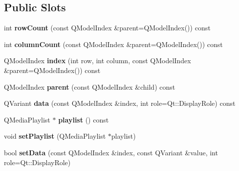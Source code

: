 \subsection*{Public Slots}
\begin{DoxyCompactItemize}
\item 
\hypertarget{class_playlist_model_a2deef5b14f8f66431a55fdb0484025b6}{int {\bfseries row\-Count} (const Q\-Model\-Index \&parent=Q\-Model\-Index()) const }\label{class_playlist_model_a2deef5b14f8f66431a55fdb0484025b6}

\item 
\hypertarget{class_playlist_model_a50cd819e7dec4c4881eebaed8130944d}{int {\bfseries column\-Count} (const Q\-Model\-Index \&parent=Q\-Model\-Index()) const }\label{class_playlist_model_a50cd819e7dec4c4881eebaed8130944d}

\item 
\hypertarget{class_playlist_model_a03d1879138b2a0c6c68d7f6d98cfa92a}{Q\-Model\-Index {\bfseries index} (int row, int column, const Q\-Model\-Index \&parent=Q\-Model\-Index()) const }\label{class_playlist_model_a03d1879138b2a0c6c68d7f6d98cfa92a}

\item 
\hypertarget{class_playlist_model_a8ff71ee8d706da034fbe8b9b613a940c}{Q\-Model\-Index {\bfseries parent} (const Q\-Model\-Index \&child) const }\label{class_playlist_model_a8ff71ee8d706da034fbe8b9b613a940c}

\item 
\hypertarget{class_playlist_model_ac3d2bee2441ad8d13662833fd5968aac}{Q\-Variant {\bfseries data} (const Q\-Model\-Index \&index, int role=Qt\-::\-Display\-Role) const }\label{class_playlist_model_ac3d2bee2441ad8d13662833fd5968aac}

\item 
\hypertarget{class_playlist_model_afe7dce718749f036b23a8cf749dc4388}{Q\-Media\-Playlist $\ast$ {\bfseries playlist} () const }\label{class_playlist_model_afe7dce718749f036b23a8cf749dc4388}

\item 
\hypertarget{class_playlist_model_aaf551c97c7a8ded2a3d3333f15f558a5}{void {\bfseries set\-Playlist} (Q\-Media\-Playlist $\ast$playlist)}\label{class_playlist_model_aaf551c97c7a8ded2a3d3333f15f558a5}

\item 
\hypertarget{class_playlist_model_a61fcc4b9d0eaad86492c283b05c30fbc}{bool {\bfseries set\-Data} (const Q\-Model\-Index \&index, const Q\-Variant \&value, int role=Qt\-::\-Display\-Role)}\label{class_playlist_model_a61fcc4b9d0eaad86492c283b05c30fbc}

\end{DoxyCompactItemize}
